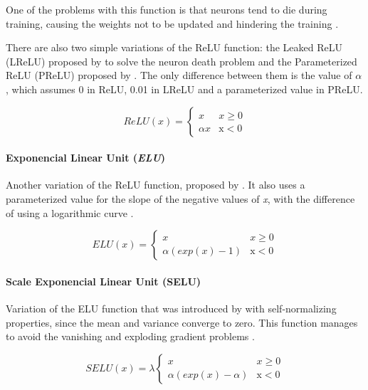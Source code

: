 \documentclass[a4paper,fleqn]{cas-sc}
\begin{document}
One of the problems with this function is that neurons tend to die during training, causing the weights not to be updated and hindering the training \cite{nwankpa2018activation}.

There are also two simple variations of the ReLU function: the Leaked ReLU (LReLU) proposed by  to solve the neuron death problem and the Parameterized ReLU (PReLU) proposed by . The only difference between them is the value of $\alpha$, which assumes 0 in ReLU, 0.01 in LReLU and a parameterized value in PReLU.

\begin{equation}
\label{eq:relu}
ReLU(x) = \left\{\begin{array}{cc}x& x \geq 0\\ {}\alpha x& \mathrm{x<0}\end{array}\right.
\end{equation}

\paragraph{Exponencial Linear Unit (\textit{ELU})}
Another variation of the ReLU function, proposed by . It also uses a parameterized value for the slope of the negative values of \textit{x}, with the difference of using a logarithmic curve \cite{sharma2020}.

\begin{equation}
\label{eq:elu}
ELU(x) = \left\{\begin{array}{cc}x& x \geq 0\\ {}\alpha(exp(x) - 1)& \mathrm{x<0}\end{array}\right.
\end{equation}

\paragraph{Scale Exponencial Linear Unit (SELU)}
Variation of the ELU function that was introduced by  with self-normalizing properties, since the mean and variance converge to zero. This function manages to avoid the vanishing and exploding gradient problems \cite{nwankpa2018activation}.

\begin{equation}
\label{eq:selu}
SELU(x) = \lambda\left\{\begin{array}{cc}x& x \geq 0\\ {}\alpha(exp(x) - \alpha)& \mathrm{x<0}\end{array}\right.
\end{equation}
\end{document}
